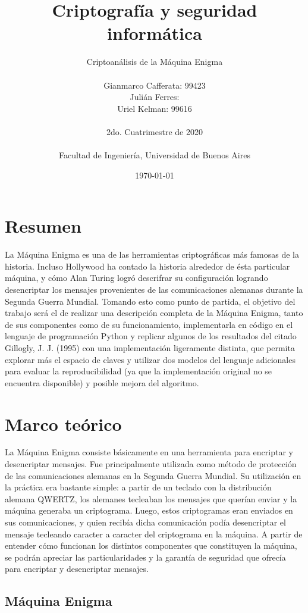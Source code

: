 \documentclass[a4paper,10pt]{article}
\title{ \Huge \textbf {Criptografía y seguridad informática}}
\author{
  \Huge Criptoanálisis de la Máquina Enigma\\
  \\
  \LARGE {Gianmarco Cafferata: 99423} \\
  \LARGE {Julián Ferres: } \\
  \LARGE {Uriel Kelman: 99616} \\
  \\
  \LARGE   2do. Cuatrimestre de 2020 \\
  \\
  \LARGE  Facultad de Ingeniería, Universidad de Buenos Aires  \\}
\date{\today}
\begin{document}
  \maketitle
  \thispagestyle{empty}
  \newpage
  \tableofcontents
  \newpage

\section{Resumen}


La Máquina Enigma es una de las herramientas criptográficas más famosas de la historia. Incluso Hollywood ha contado la historia alrededor de ésta particular máquina, y cómo Alan Turing logró descrifrar su configuración logrando desencriptar los mensajes provenientes de las comunicaciones alemanas durante la Segunda Guerra Mundial. Tomando esto como punto de partida, el objetivo del trabajo será el de realizar una descripción completa de la Máquina Enigma, tanto de sus componentes como de su funcionamiento, implementarla en código en el lenguaje de programación Python y replicar algunos de los resultados del citado Gillogly, J. J. (1995)\cite{gillogly} con una implementación ligeramente distinta, que permita explorar más el espacio de claves y utilizar dos modelos del lenguaje adicionales para evaluar la reproducibilidad (ya que la implementación original no se encuentra disponible) y posible mejora del algoritmo.

\section{Marco teórico}

La Máquina Enigma consiste básicamente en una herramienta para encriptar y desencriptar mensajes. Fue principalmente utilizada como método de protección de las comunicaciones alemanas en la Segunda Guerra Mundial. Su utilización en la práctica era bastante simple: a partir de un teclado con la distribución alemana QWERTZ, los alemanes tecleaban los mensajes que querían enviar y la máquina generaba un criptograma. Luego, estos criptogramas eran enviados en sus comunicaciones, y quien recibía dicha comunicación podía desencriptar el mensaje tecleando caracter a caracter del criptograma en la máquina. A partir de entender cómo funcionan los distintos componentes que constituyen la máquina, se podrán apreciar las particularidades y la garantía de seguridad que ofrecía para encriptar y desencriptar mensajes.

\subsection{Máquina Enigma}
\end{document}
